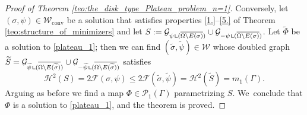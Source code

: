 \documentclass[11pt]{article}
\numberwithin{equation}{section}
\let\Om\Omega
\newcommand\admclassconv{{\mathcal W_\mathrm{conv}}}
\newcommand{\resa}{\mathop{\hbox{\vrule height 7pt width 0.5pt depth 0pt
\vrule height 0.5pt width 6pt depth 0pt}}\nolimits}
\newcommand{\resb}{\mathop{\hbox{\vrule height 4pt width 0.5pt depth 0pt
\vrule height 0.5pt width 3pt depth 0pt}}\nolimits}
\newcommand{\res}{\mathchoice{\resa}{\resa}{\resb}{\resb}}
\theoremstyle{definition}
\begin{document}
\begin{proof}[Proof of Theorem \ref{teo:the_disk_type_Plateau_problem_n=1}]
Conversely, let $(\sigma,\psi)\in \admclassconv$ be a solution that
satisfies properties \ref{1.}--\ref{5.} of Theorem \ref{teo:structure_of_minimizers} and let $S:=\mathcal{G}_{\psi\res(\overline{\Om\setminus E(\sigma)})}
\cup \mathcal{G}_{-\psi\res(\overline{\Om\setminus E(\sigma)})}$.
Let $\widetilde\Phi$ be a solution to \eqref{plateau_1}; then we can find $(\widetilde\sigma,\widetilde\psi)\in \mathcal W$ whose
doubled graph $\widetilde S=\mathcal G_{\widetilde\psi\res (\overline{\Om\setminus E(\widetilde\sigma)})}\cup\mathcal G_{-\widetilde\psi\res (\overline{\Om\setminus E(\widetilde\sigma)})}$ satisfies
\[
 \mathcal H^2(S)=2\mathcal F(\sigma,\psi)\leq2\mathcal F(\widetilde\sigma,\widetilde\psi)=\mathcal H^2(\widetilde S)=m_1(\Gamma).
\]
Arguing as before we find a map $\Phi\in \mathcal P_1(\Gamma)$ parametrizing $S$. We~conclude that $\Phi$ is a solution to \eqref{plateau_1}, and the theorem is proved.
\end{proof}
\end{document}
